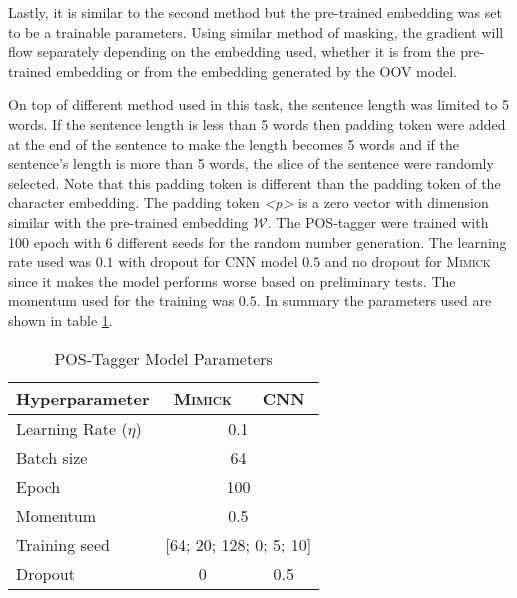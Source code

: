         Lastly, it is similar to the second method but the pre-trained
        embedding was set to be a trainable parameters. Using similar
        method of masking, the gradient will flow separately depending
        on the embedding used, whether it is from the pre-trained
        embedding or from the embedding generated by the OOV model.

        On top of different method used in this task, the sentence
        length was limited to 5 words. If the sentence length is less
        than 5 words then padding token were added at the end of the
        sentence to make the length becomes 5 words and if the
        sentence's length is more than 5 words, the slice of the
        sentence were randomly selected. Note that this padding token
        is different than the padding token of the character
        embedding. The padding token \textit{\textless p\textgreater}
        is a zero vector with dimension similar with the pre-trained
        embedding $\mathcal{W}$. The POS-tagger were trained with 100
        epoch with 6 different seeds for the random number generation.
        The learning rate used was $0.1$ with dropout for CNN model
        $0.5$ and no dropout for \textsc{Mimick} since it makes the
        model performs worse based on preliminary tests. The momentum
        used for the training was $0.5$. In summary the parameters
        used are shown in table \ref{tab:hyperparameterpostag}.

        \begin{table}[]
            \centering
            \caption{POS-Tagger Model Parameters}
            \label{tab:hyperparameterpostag}
            \begin{tabular}{@{}lcc@{}}
                \toprule
                \textbf{Hyperparameter} & \multicolumn{1}{c}{\textbf{\textsc{Mimick}}} & \multicolumn{1}{c}{\textbf{CNN}} \\ \midrule
                Learning Rate ($\eta$) & \multicolumn{2}{c}{0.1} \\
                Batch size & \multicolumn{2}{c}{64} \\
                Epoch & \multicolumn{2}{c}{100} \\
                Momentum & \multicolumn{2}{c}{0.5} \\
                Training seed & \multicolumn{2}{c}{[64; 20; 128; 0; 5;
                10]} \\
                Dropout & 0 & 0.5 \\ 
                \bottomrule
            \end{tabular}
        \end{table}

